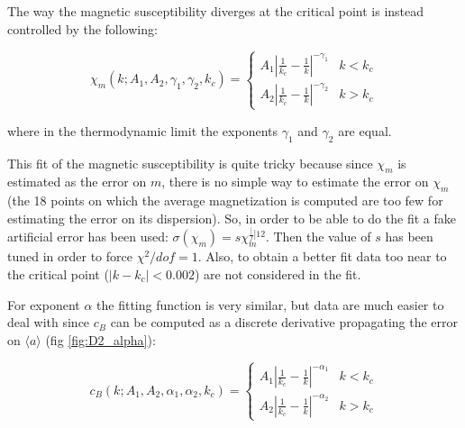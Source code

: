 \documentclass[a4paper, 11pt]{article}
\begin{document}
      The way the magnetic susceptibility diverges at the critical point is instead controlled by the following:

      \begin{equation*}
        \chi_m(k;A_1,A_2,\gamma_1,\gamma_2,k_c) = \begin{cases}
          A_1 \left|\frac{1}{k_c} - \frac{1}{k} \right|^{-\gamma_1} & k < k_c \\
          A_2 \left|\frac{1}{k_c} - \frac{1}{k} \right|^{-\gamma_2} & k > k_c
        \end{cases}
      \end{equation*}

      where in the thermodynamic limit the exponents $\gamma_1$ and $\gamma_2$ are equal.

      This fit of the magnetic susceptibility is quite tricky because since $\chi_m$ is estimated as the error on $m$, there is no simple way to estimate the error on $\chi_m$ (the 18 points on which the average magnetization is computed are too few for estimating the error on its dispersion). So, in order to be able to do the fit a fake artificial error has been used: $\sigma(\chi_m) = s\chi_m^{\frac[f]{1}{2}}$. Then the value of $s$ has been tuned in order to force $\chi^2/dof = 1$. Also, to obtain a better fit data too near to the critical point ($|k - k_c| < 0.002$) are not considered in the fit.

      For exponent $\alpha$ the fitting function is very similar, but data are much easier to deal with since $c_B$ can be computed as a discrete derivative propagating the error on $\langle a \rangle$ (fig \ref{fig:D2_alpha}):

      \begin{equation*}
        c_B(k;A_1,A_2,\alpha_1,\alpha_2,k_c) = \begin{cases}
          A_1 \left|\frac{1}{k_c} - \frac{1}{k} \right|^{-\alpha_1} & k < k_c \\
          A_2 \left|\frac{1}{k_c} - \frac{1}{k} \right|^{-\alpha_2} & k > k_c
        \end{cases}
      \end{equation*}
\end{document}
